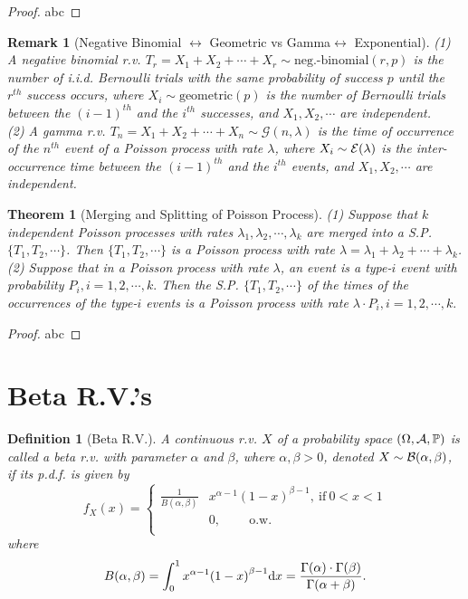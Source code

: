 \documentclass[openany,12pt]{book}
\newtheorem{theorem}{Theorem}[chapter]
\newtheorem{remark}{Remark}[chapter]
\newtheorem{definition}{Definition}[chapter]
\begin{document}
\begin{proof}
  abc
\end{proof}

\begin{remark}[Negative Binomial $\leftrightarrow$ Geometric vs Gamma$ \leftrightarrow$ Exponential]
  (1) A negative binomial r.v. $T_r=X_1+ X_2+\cdots+X_r\sim\text{neg.-binomial}(r,p)$ is the number of i.i.d. Bernoulli trials with the same probability of success $p$ until the $r^{th}$ success occurs, where $X_i\sim\mathrm{geometric}(p)$ is the number of Bernoulli trials between the ${(i-1)}^{th}$ and the $i^{th}$ successes, and $X_1,X_2,\cdots$ are independent.\\

  (2) A gamma r.v. $T_n=X_1+X_2+\cdots+X_n\sim\mathcal{G}(n,\lambda)$ is the time of occurrence of the $n^{th}$ event of a Poisson process with rate $\lambda$, where $X_i\sim\mathcal{E}(\lambda)$ is the inter-occurrence time between the ${(i-1)}^{th}$ and the $i^{th}$ events, and $X_1,X_2,\cdots$ are independent.
\end{remark}

\begin{theorem}[Merging and Splitting of Poisson Process]
  (1) Suppose that $k$ independent Poisson processes with rates $\lambda_1,\lambda_2, \cdots,\lambda_k$ are merged into a S.P. $\{T_1,T_2,\cdots\}$. Then $\{T_1,T_2,\cdots\}$ is a Poisson process with rate $\lambda=\lambda_1+\lambda_2+\cdots+\lambda_k$.\\

  (2) Suppose that in a Poisson process with rate $\lambda$, an event is a type-$i$ event with probability $P_i, i=1,2, \cdots,k.$ Then the S.P. $\{T_1,T_2,\cdots\}$ of the times of the occurrences of the type-$i$ events is a
  Poisson process with rate $\lambda\cdot P_i, i=1,2, \cdots,k.$
\end{theorem}

\begin{proof}
  abc
\end{proof}

\section{Beta R.V.'s}

\begin{definition}[Beta R.V.]
  A continuous r.v. $X$ of a probability space $(\Omega,\mathcal{A},\mathbb{P})$ is called a beta r.v. with parameter $\alpha$ and $\beta$, where $\alpha,\beta>0$, denoted $X\sim\mathcal{B}(\alpha,\beta)$, if its p.d.f. is given by
  \[f_{X}(x)= \left\{ \begin{aligned}
      \frac{1}{B(\alpha,\beta)} & x^{\alpha - 1}{(1 - x)}^{\beta - 1}, ~\text{if}~  0 < x < 1 \\
                                & 0, \qquad~\text{o.w.}~                                      \\
    \end{aligned} \right.\]
  where
  \[B(\alpha,\beta)= \int_{0}^{1}x^{\alpha - 1}{(1 - x)}^{\beta - 1}\mathrm{d} x = \frac{\Gamma( \alpha) \cdot \Gamma( \beta)}{\Gamma( \alpha + \beta)}.\]
\end{definition}
\end{document}
